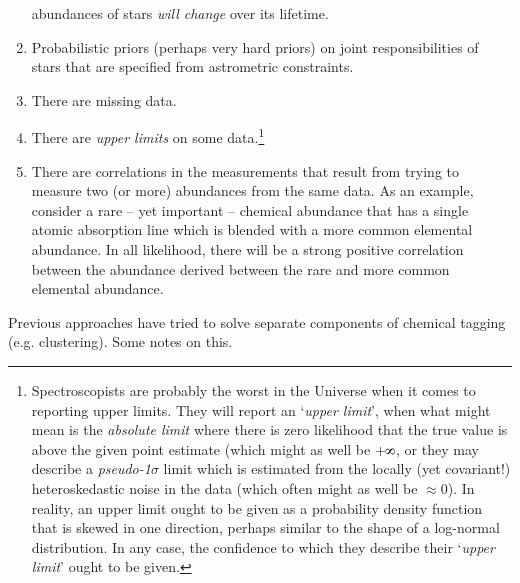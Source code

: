 \documentclass{aastex61}
\def\infinity{\rotatebox{90}{8}}
\begin{document}
\begin{enumerate}
      abundances of stars \emph{will change} over its lifetime.
\item Probabilistic priors (perhaps very hard priors) on joint responsibilities
      of stars that are specified from astrometric constraints.
\item There are missing data. 
\item There are \emph{upper limits} on some data.\footnote{
        Spectroscopists are probably the worst in the Universe when it comes to
        reporting upper limits. They will report an `\emph{upper limit}', when
        what might mean is the \emph{absolute limit} where there is zero
        likelihood that the true value is above the given point estimate (which might as well be $+\infinity$, or
        they may describe a \emph{pseudo-1$\sigma$} limit which is estimated
        from the locally (yet covariant!) heteroskedastic noise in the data (which often might as well be $\approx$0).
        In reality, an upper limit ought to be given as a probability density
        function that is skewed in one direction, perhaps similar to the shape
        of a log-normal distribution. In any case, the confidence to which they
        describe their `\emph{upper limit}' ought to be given.}
\item There are correlations in the measurements that result from trying to
      measure two (or more) abundances from the same data. As an example,
      consider a rare -- yet important -- chemical abundance that has a single
      atomic absorption line which is blended with a more common elemental
      abundance. In all likelihood, there will be a strong positive correlation
      between the abundance derived between the rare and more common elemental
      abundance.
\end{enumerate}














Previous approaches have tried to solve separate components of chemical tagging (e.g. clustering). Some notes on this.
\end{document}
